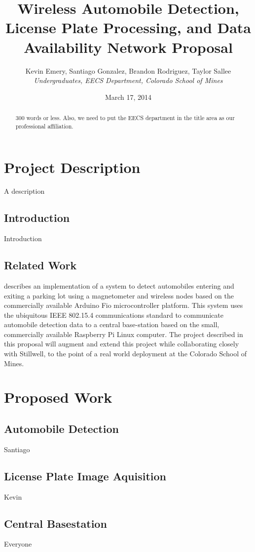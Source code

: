 \documentclass[11pt, oneside, fullpage, doublespace]{article}
\title{Wireless Automobile Detection, License Plate Processing, and Data Availability Network Proposal}
\author{Kevin Emery, Santiago Gonzalez, Brandon Rodriguez, Taylor Sallee\\ \emph{Undergraduates, EECS Department, Colorado School of Mines}}
\date{March 17, 2014}
\begin{document}
\maketitle

\begin{abstract}
300 words or less. Also, we need to put the EECS department in the title area as our professional affiliation.
\end{abstract}

\section{Project Description}
A description

\subsection{Introduction}
Introduction

\subsection{Related Work}
\cite{stillwell2013} describes an implementation of a system to detect automobiles entering and exiting a parking lot using a magnetometer and wireless nodes based on the commercially available Arduino Fio microcontroller platform. This system uses the ubiquitous IEEE 802.15.4 communications standard to communicate automobile detection data to a central base-station based on the small, commercially available Raspberry Pi Linux computer. The project described in this proposal will augment and extend this project while collaborating closely with Stillwell, to the point of a real world deployment at the Colorado School of Mines.

\section{Proposed Work}
\subsection{Automobile Detection}
Santiago
\subsection{License Plate Image Aquisition}
Kevin
\subsection{Central Basestation}
Everyone
\end{document}
